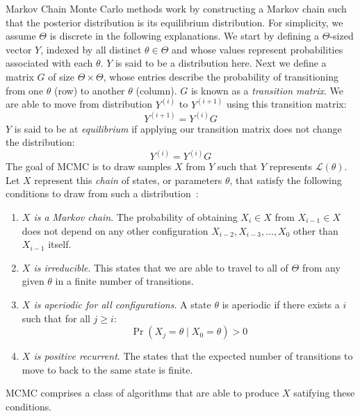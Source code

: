 Markov Chain Monte Carlo methods work by constructing a Markov chain such that the posterior distribution is its
equilibrium distribution.
For simplicity, we assume $\Theta$ is discrete in the following explanations.
We start by defining a $\Theta$-sized vector $Y$, indexed by all distinct $\theta \in \Theta$ and whose values represent
probabilities associated with each $\theta$.
$Y$ is said to be a distribution here.
Next we define a matrix $G$ of size $\Theta \times \Theta$, whose entries describe the probability of transitioning
from one $\theta$ (row) to another $\theta$ (column).
$G$ is known as a \emph{transition matrix}.
We are able to move from distribution $Y^{(i)}$ to $Y^{(i + 1)}$ using this transition matrix:
\begin{equation}
    Y^{(i + 1)} = Y^{(i)} G
\end{equation}
$Y$ is said to be at \emph{equilibrium} if applying our transition matrix does not change the distribution:
\begin{equation}
    Y^{(i)} = Y^{(i)} G
\end{equation}
The goal of MCMC is to draw samples $X$ from $Y$ such that $Y$ represents $\mathcal{L}(\theta)$.
Let $X$ represent this \emph{chain} of states, or parameters $\theta$, that satisfy the following
conditions to draw from such a distribution~\cite{hanadaMarkovChainMonte2018}:
\begin{enumerate}
    \item \emph{$X$ is a Markov chain}.
        The probability of obtaining $X_i \in X$ from $X_{i - 1} \in X$ does not depend on any other configuration
        $X_{i - 2}, X_{i - 3}, \ldots, X_0$ other than $X_{i - 1}$ itself.
    \item \emph{$X$ is irreducible}.
        This states that we are able to travel to all of $\Theta$ from any given $\theta$ in a finite number of
        transitions.
    \item \emph{$X$ is aperiodic for all configurations}.
        A state $\theta$ is aperiodic if there exists a $i$ such that for all $j \geq i$:
        \begin{equation}
            \Pr \left( X_{j} = \theta \mid X_0 = \theta \right) > 0
        \end{equation}
    \item \emph{$X$ is positive recurrent}.
        The states that the expected number of transitions to move to back to the same state is finite.
\end{enumerate}
MCMC comprises a class of algorithms that are able to produce $X$ satifying these conditions.

